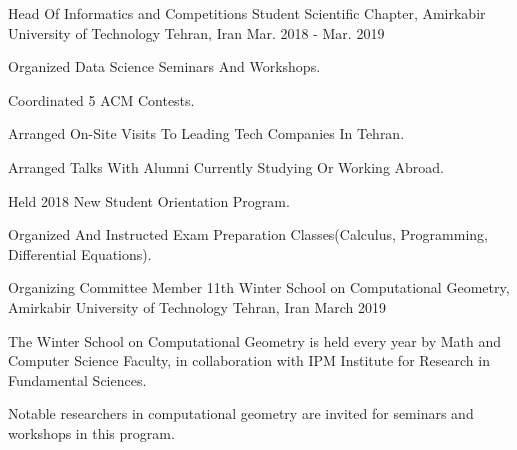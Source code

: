 \documentclass[11pt, a4paper]{awesome-cv}
\begin{document}
\begin{cventries}
	\cventry
	{Head Of Informatics and Competitions} %
	{Student Scientific Chapter, Amirkabir University of Technology} %
	{Tehran, Iran} %
	{Mar. 2018 - Mar. 2019} %
	{
		\begin{cvitems} %
			\item {Organized Data Science Seminars And Workshops.}
			\item {Coordinated 5 ACM Contests.}
			\item {Arranged On-Site Visits To Leading Tech Companies In Tehran.}
			\item {Arranged Talks With Alumni Currently Studying Or Working Abroad.}
			\item {Held 2018 New Student Orientation Program.}
			\item {Organized And Instructed Exam Preparation Classes(Calculus, Programming, Differential Equations).}
		\end{cvitems}
	}
	
	\cventry
	{Organizing Committee Member} %
	{11th Winter School on Computational Geometry, Amirkabir University of Technology} %
	{Tehran, Iran} %
	{March 2019} %
	{
		\begin{cvitems} %
			\item 	{The Winter School on Computational Geometry is held every year by Math and Computer Science Faculty, in collaboration with IPM Institute for Research in Fundamental Sciences.}
			\item {Notable researchers in computational geometry are invited for seminars and workshops in this program.}
		\end{cvitems}
	}
	
\end{cventries}

\end{document}
